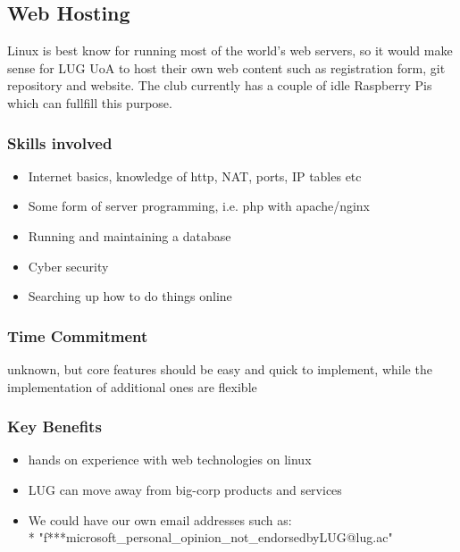 \subsection{Web Hosting}

Linux is best know for running most of the world's web servers, so it would make sense for LUG UoA to host their own web content such as registration form, git repository and website. The club currently has a couple of idle Raspberry Pis which can fullfill this purpose.

\subsubsection*{Skills involved}

\begin{itemize}
    \item Internet basics, knowledge of http, NAT, ports, IP tables etc
    \item Some form of server programming, i.e. php with apache/nginx
    \item Running and maintaining a database
    \item Cyber security
    \item Searching up how to do things online
\end{itemize}

\subsubsection*{Time Commitment}
unknown, but core features should be easy and quick to implement, while the implementation of additional ones are flexible

\subsubsection*{Key Benefits}
\begin{itemize}
    \item hands on experience with web technologies on linux
    \item LUG can move away from big-corp products and services
    \item We could have our own email addresses such as: \\*
    "f***microsoft\_personal\_opinion\_not\_endorsedbyLUG@lug.ac"
\end{itemize}